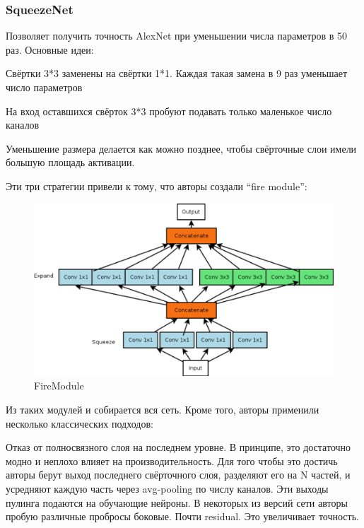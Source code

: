 \subsubsection*{SqueezeNet}
Позволяет получить точность AlexNet при уменьшении числа параметров в 50 раз.
Основные идеи:
\begin{compactitem}

\item Свёртки 3*3 заменены на свёртки 1*1. Каждая такая замена в 9 раз уменьшает число параметров
\item На вход оставшихся свёрток 3*3 пробуют подавать только маленькое число каналов
\item Уменьшение размера делается как можно позднее, чтобы свёрточные слои имели большую площадь активации.
\end{compactitem}
Эти три стратегии привели к тому, что авторы создали “fire module”:
\begin{figure}
	\centering
	\includegraphics[width=0.7\linewidth]{img/firemodule}
	\caption{FireModule}
	\label{fig:firemodule}
\end{figure}

Из таких модулей и собирается вся сеть. Кроме того, авторы применили несколько классических подходов:

Отказ от полносвязного слоя на последнем уровне. В принципе, это достаточно модно и неплохо влияет на производительность. Для того чтобы это достичь авторы берут выход последнего свёрточного слоя, разделяют его на N частей, и усредняют каждую часть через avg-pooling по числу каналов. Эти выходы пулинга подаются на обучающие нейроны.
В некоторых из версий сети авторы пробую различные пробросы боковые. Почти residual. Это увеличивает точность.



